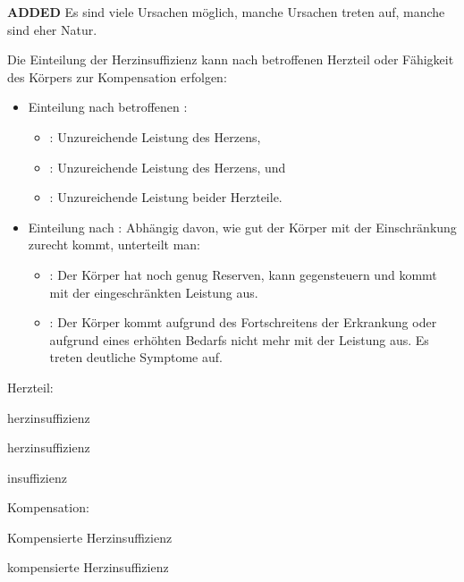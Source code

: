 \documentclass[
ngerman,
paper=a4,
asymmetric,
fontsize=10pt,
headings=small,
draft=false,
numbers=noenddot,
bibtotocnumbered,
footnotes=multiple,
]{scrreprt}
\newcommand{\jNEU}{{\color{green}\sffamily\textbf{ADDED}\hrulefill\newline\newline}}
\newcommand{\jNEUende}{\newline{\color{green}\rule{\linewidth}{3pt}\newline}}
\begin{document}
\begin{enumerate}
\jNEU
{}
Es sind viele Ursachen
möglich, manche Ursachen treten  auf, manche sind
 eher  Natur.
 
 
 
{Die Einteilung der Herzinsuffizienz kann nach betroffenen
Herzteil oder Fähigkeit des Körpers zur Kompensation
erfolgen:
\begin{itemize}
  \item Einteilung nach betroffenen :
 \begin{itemize}
   \item {}: Unzureichende Leistung des 
   Herzens,
   \item {}:
   Unzureichende Leistung des  Herzens, und
   \item {}: Unzureichende Leistung beider Herzteile.
 \end{itemize}
  \item Einteilung nach : Abhängig davon, wie
  gut der Körper mit der
 Einschränkung zurecht kommt, unterteilt man:
 \begin{itemize}
   \item {}: Der Körper hat noch
   genug Reserven, kann gegensteuern und kommt mit der
   eingeschränkten Leistung aus.
   \item {}:
   Der Körper kommt aufgrund des Fortschreitens der
   Erkrankung oder aufgrund eines erhöhten Bedarfs nicht mehr
   mit der Leistung aus. Es treten deutliche
   Symptome auf.
 \end{itemize}
\end{itemize}
 }{
 \begin{compactitem}
   \item Herzteil:
   \begin{compactitem}
     \item {}herzinsuffizienz
     \item {}herzinsuffizienz
     \item {}insuffizienz
   \end{compactitem}
   \item Kompensation:
   \begin{compactitem}
     \item Kompensierte Herzinsuffizienz
     \item {}kompensierte Herzinsuffizienz
   \end{compactitem}
 \end{compactitem}
 }{}{}{}
\jNEUende


\end{enumerate}
\end{document}
